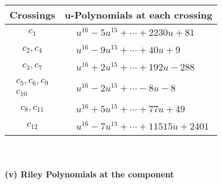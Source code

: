 \documentclass[1p]{elsarticle_modified}
\theoremstyle{definition}
\begin{document}
\begin{tabular}{m{50pt}|m{274pt}}
Crossings & \hspace{64pt}u-Polynomials at each crossing \\
\hline $$\begin{aligned}c_{1}\end{aligned}$$&$\begin{aligned}
&u^{16}-5 u^{15}+\cdots+2230 u+81
\end{aligned}$\\
\hline $$\begin{aligned}c_{2},c_{4}\end{aligned}$$&$\begin{aligned}
&u^{16}-9 u^{15}+\cdots+40 u+9
\end{aligned}$\\
\hline $$\begin{aligned}c_{3},c_{7}\end{aligned}$$&$\begin{aligned}
&u^{16}+2 u^{15}+\cdots+192 u-288
\end{aligned}$\\
\hline $$\begin{aligned}c_{5},c_{6},c_{9}\\c_{10}\end{aligned}$$&$\begin{aligned}
&u^{16}-2 u^{15}+\cdots-8 u-8
\end{aligned}$\\
\hline $$\begin{aligned}c_{8},c_{11}\end{aligned}$$&$\begin{aligned}
&u^{16}+5 u^{15}+\cdots+77 u+49
\end{aligned}$\\
\hline $$\begin{aligned}c_{12}\end{aligned}$$&$\begin{aligned}
&u^{16}-7 u^{15}+\cdots+11515 u+2401
\end{aligned}$\\
\hline
\end{tabular}\\~\\
\newpage\renewcommand{\arraystretch}{1}
\flushleft \textbf{(v) Riley Polynomials at the component}\newline \\
\end{document}
